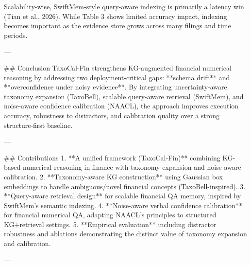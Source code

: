 Scalability-wise, SwiftMem-style query-aware indexing is primarily a latency win (Tian et al., 2026). While Table 3 shows limited accuracy impact, indexing becomes important as the evidence store grows across many filings and time periods.

---

## Conclusion  
TaxoCal-Fin strengthens KG-augmented financial numerical reasoning by addressing two deployment-critical gaps: **schema drift** and **overconfidence under noisy evidence**. By integrating uncertainty-aware taxonomy expansion (TaxoBell), scalable query-aware retrieval (SwiftMem), and noise-aware confidence calibration (NAACL), the approach improves execution accuracy, robustness to distractors, and calibration quality over a strong structure-first baseline.

---

## Contributions  
1. **A unified framework (TaxoCal-Fin)** combining KG-based numerical reasoning in finance with taxonomy expansion and noise-aware calibration.  
2. **Taxonomy-aware KG construction** using Gaussian box embeddings to handle ambiguous/novel financial concepts (TaxoBell-inspired).  
3. **Query-aware retrieval design** for scalable financial QA memory, inspired by SwiftMem’s semantic indexing.  
4. **Noise-aware verbal confidence calibration** for financial numerical QA, adapting NAACL’s principles to structured KG+retrieval settings.  
5. **Empirical evaluation** including distractor robustness and ablations demonstrating the distinct value of taxonomy expansion and calibration.

---